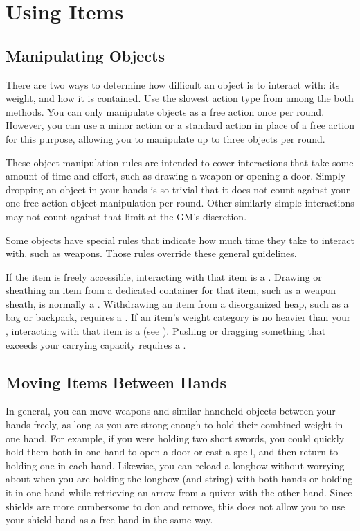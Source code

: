 \section{Using Items}

  \subsection{Manipulating Objects}\label{Manipulating Objects}
    There are two ways to determine how difficult an object is to interact with: its weight, and how it is contained.
    Use the slowest action type from among the both methods.
    You can only manipulate objects as a free action once per round.
    However, you can use a minor action or a standard action in place of a free action for this purpose, allowing you to manipulate up to three objects per round.

    These object manipulation rules are intended to cover interactions that take some amount of time and effort, such as drawing a weapon or opening a door.
    Simply dropping an object in your hands is so trivial that it does not count against your one free action object manipulation per round.
    Other similarly simple interactions may not count against that limit at the GM's discretion.

    Some objects have special rules that indicate how much time they take to interact with, such as  weapons.
    Those rules override these general guidelines.

    \begin{raggeditemize}
       If the item is freely accessible, interacting with that item is a .
        Drawing or sheathing an item from a dedicated container for that item, such as a weapon sheath, is normally a .
        Withdrawing an item from a disorganized heap, such as a bag or backpack, requires a .
       If an item's weight category is no heavier than your , interacting with that item is a  (see ).
        Pushing or dragging something that exceeds your carrying capacity requires a .
    \end{raggeditemize}

  \subsection{Moving Items Between Hands}\label{Moving Items Between Hands}
    In general, you can move weapons and similar handheld objects between your hands freely, as long as you are strong enough to hold their combined weight in one hand.
    For example, if you were holding two short swords, you could quickly hold them both in one hand to open a door or cast a spell, and then return to holding one in each hand.
    Likewise, you can reload a longbow without worrying about when you are holding the longbow (and string) with both hands or holding it in one hand while retrieving an arrow from a quiver with the other hand.
    Since shields are more cumbersome to don and remove, this does not allow you to use your shield hand as a free hand in the same way.

